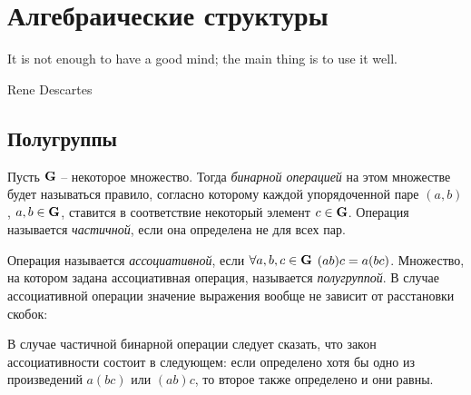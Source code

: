 \section{Алгебраические структуры}
\label{groups}

\newcommand{\mnod}[2]{\left( #1 ; #2 \right)}
\newcommand{\mnok}[2]{\left[ #1 ; #2 \right]}

\epigraph{It is not enough to have a good mind; the main thing is to use it well.}{Rene Descartes}

\subsection{Полугруппы}

\begin{df}
  Пусть $\mathbf{G}$ -- некоторое множество. Тогда \emph{бинарной операцией} на этом множестве будет называться правило, согласно которому каждой упорядоченной паре $(a,b)$, $a,b\in\mathbf{G}$, ставится в соответствие некоторый элемент $c\in\mathbf{G}$. Операция называется \emph{частичной}, если она определена не для всех пар.
\end{df}

\begin{df}
  Операция называется \emph{ассоциативной}, если $\forall a,b,c\in\mathbf{G}$ $(ab)c\bw=a(bc)$. Множество, на котором задана ассоциативная операция, называется \emph{полугруппой}. В случае ассоциативной операции значение выражения вообще не зависит от расстановки скобок:
\end{df}
\begin{note}
 В случае частичной бинарной операции следует сказать, что закон ассоциативности состоит в следующем: если определено хотя бы одно из произведений $a(bc)$ или $(ab)c$, то второе также определено и они равны.
\end{note}

